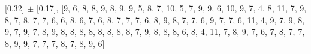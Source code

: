 
[0.32] $\pm$ [0.17], [9, 6, 8, 8, 9, 8, 9, 9, 5, 8, 7, 10, 5, 7, 9, 9, 6, 10, 9, 7, 4, 8, 11, 7, 9, 8, 7, 8, 7, 7, 6, 6, 8, 6, 7, 6, 8, 7, 7, 7, 6, 8, 9, 8, 7, 7, 6, 9, 7, 7, 6, 11, 4, 9, 7, 9, 8, 9, 7, 9, 7, 8, 9, 8, 8, 8, 8, 8, 8, 8, 8, 7, 9, 8, 8, 8, 6, 8, 4, 11, 7, 8, 9, 7, 6, 7, 8, 7, 7, 8, 9, 9, 7, 7, 7, 8, 7, 8, 9, 6]\\
